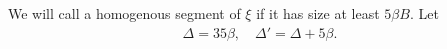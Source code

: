 \documentclass[12pt]{memoir}
\newcommand{\fld}[1]{\ensuremath{\textit{#1}}}
\def\B{B}
\newcommand{\D}{D}
\newcommand{\Plus}{\oplus}
\newcommand{\Minus}{\ominus}
\newcommand{\cArb}{\fld{cArb}}
\newcommand{\Core}{\fld{Core}}
\begin{document}






\begin{definition}\label{def:Delta}
We will call a homogenous segment of \( \xi \)  if it has size 
at least \( 5\beta\B \).
  Let
 \begin{align*}
 \Delta=35\beta,\quad \Delta'=\Delta+5\beta.
 \end{align*}
\end{definition}
\end{document}
